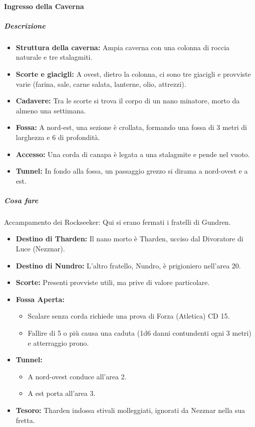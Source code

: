 \documentclass{article}
\begin{document}
        \paragraph{Ingresso della Caverna}

        \subparagraph{Descrizione}
        \begin{itemize}
            \item \textbf{Struttura della caverna:} Ampia caverna con una colonna di roccia naturale e tre stalagmiti.
            \item \textbf{Scorte e giacigli:} A ovest, dietro la colonna, ci sono tre giacigli e provviste varie (farina, sale, carne salata, lanterne, olio, attrezzi).
            \item \textbf{Cadavere:} Tra le scorte si trova il corpo di un nano minatore, morto da almeno una settimana.
            \item \textbf{Fossa:} A nord-est, una sezione è crollata, formando una fossa di 3 metri di larghezza e 6 di profondità.
            \item \textbf{Accesso:} Una corda di canapa è legata a una stalagmite e pende nel vuoto.
            \item \textbf{Tunnel:} In fondo alla fossa, un passaggio grezzo si dirama a nord-ovest e a est.
        \end{itemize}
        \subparagraph{Cosa fare} 
        Accampamento dei Rockseeker: Qui si erano fermati i fratelli di Gundren.

        \begin{itemize}
                        \item \textbf{Destino di Tharden:} Il nano morto è Tharden, ucciso dal Divoratore di Luce (Nezznar).
            \item \textbf{Destino di Nundro:} L’altro fratello, Nundro, è prigioniero nell’area 20.
            \item \textbf{Scorte:} Presenti provviste utili, ma prive di valore particolare.
            \item \textbf{Fossa Aperta:}
            \begin{itemize}
                \item Scalare senza corda richiede una prova di Forza (Atletica) CD 15.
                \item Fallire di 5 o più causa una caduta (1d6 danni contundenti ogni 3 metri) e atterraggio prono.
            \end{itemize}
            \item \textbf{Tunnel:}
            \begin{itemize}
                \item A nord-ovest conduce all’area 2.
                \item A est porta all’area 3.
            \end{itemize}
            \item \textbf{Tesoro:} Tharden indossa stivali molleggiati, ignorati da Nezznar nella sua fretta.
        \end{itemize}
\end{document}
